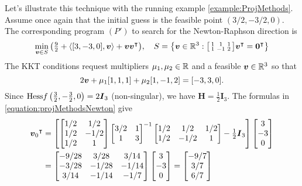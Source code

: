 \begin{example}
Let's illustrate this technique with the running example \ref{example:ProjMethods}. Assume once again that the initial guess is the feasible point $(3/2, -3/2, 0)$. The corresponding program $(P')$ to search for the Newton-Raphson direction is
\begin{equation*}
\min_{\boldsymbol{v} \in S} \big( \tfrac{9}{2} + \langle [3,-3,0], \boldsymbol{v} \rangle + \boldsymbol{v}{\boldsymbol{v}}^\intercal \big), \quad S = \big\{ \boldsymbol{v} \in \mathbb{R}^3 : \big[ \begin{smallmatrix} 1 & 1 & 1 \\ 1 & -1 & 2 \end{smallmatrix}\big] {\boldsymbol{v}}^\intercal = {\boldsymbol{0}}^\intercal \big\}
\end{equation*}
The KKT conditions request multipliers $\mu_1, \mu_2 \in \mathbb{R}$ and a feasible $\boldsymbol{v} \in \mathbb{R}^3$ so that
\begin{equation*}
2\boldsymbol{v} + \mu_1 [1,1,1] + \mu_2 [1,-1,2] = [-3,3,0].
\end{equation*}
Since $\mathop{\mathrm{Hess}{f}}\big(\tfrac{3}{2},-\tfrac{3}{2},0\big) = 2 \boldsymbol{I}_3$ (non-singular), we have $\boldsymbol{H} = \tfrac{1}{2} \boldsymbol{I}_3$.  The formulas in \eqref{equation:projMethodsNewton} give
\begin{align*}
\transpose{\v_0} &= \left[ \begin{bmatrix} 1/2 & 1/2 \\ 1/2 & -1/2 \\ 1/2 & 1 \end{bmatrix} \begin{bmatrix} 3/2 & 1 \\ 1 & 3 \end{bmatrix}^{-1} \begin{bmatrix} 1/2 & 1/2 & 1/2 \\ 1/2 & -1/2 & 1 \end{bmatrix} - \tfrac{1}{2} \boldsymbol{I}_3 \right] \begin{bmatrix} 3 \\ -3 \\ 0 \end{bmatrix} \\
&= \begin{bmatrix} -9/28 & 3/28 & 3/14 \\ -3/28 & -1/28 & -1/14 \\ 3/14 & -1/14 & -1/7 \end{bmatrix} \begin{bmatrix} 3 \\ -3 \\ 0 \end{bmatrix} = \begin{bmatrix} -9/7 \\ 3/7 \\ 6/7 \end{bmatrix} \\

\end{align*}
\end{example}
